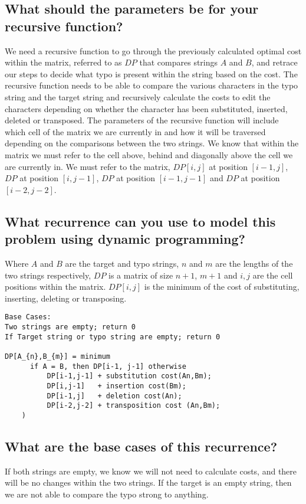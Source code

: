 \documentclass[letterpaper,12pt]{article}
\begin{document}
\subsection{What should the parameters be for your recursive function?}
We need a recursive function to go through the previously calculated optimal cost within the matrix, referred to as $DP$ that compares strings $A$ and $B$, and retrace our steps to decide what typo is present within the string based on the cost. The recursive function needs to be able to compare the various characters in the typo string and the target string and recursively calculate the costs to edit the characters depending on whether the character has been substituted, inserted, deleted or transposed. The parameters of the recursive function will include which cell of the matrix we are currently in and how it will be traversed depending on the comparisons between the two strings. We know that within the matrix we must refer to the cell above, behind and diagonally above the cell we are currently in. We must refer to the matrix, $DP[i,j]$ at position $[i-1, j]$, $DP$ at position $[i, j-1]$, $DP$ at position $[i-1, j-1]$ and $DP$ at position $[i-2, j-2]$.

\subsection{What recurrence can you use to model this problem using dynamic programming?}
Where $A$ and $B$ are the target and typo strings, $n$ and $m$ are the lengths of the two strings respectively, $DP$ is a matrix of size $n+1$, $m+1$ and $i,j$ are the cell positions within the matrix. $DP[i,j]$ is the minimum of the cost of substituting, inserting, deleting or transposing. 
\newline
\begin{lstlisting}
Base Cases:
Two strings are empty; return 0 
If Target string or typo string are empty; return 0 

DP[A_{n},B_{m}] = minimum
      if A = B, then DP[i-1, j-1] otherwise
    	  DP[i-1,j-1] + substitution cost(An,Bm);
    	  DP[i,j-1]   + insertion cost(Bm);
    	  DP[i-1,j]   + deletion cost(An);
    	  DP[i-2,j-2] + transposition cost (An,Bm);
	)
\end{lstlisting}

\subsection{What are the base cases of this recurrence?}
If both strings are empty, we know we will not need to calculate costs, and there will be no changes within the two strings. If the target is an empty string, then we are not able to compare the typo strong to anything. 
\end{document}
